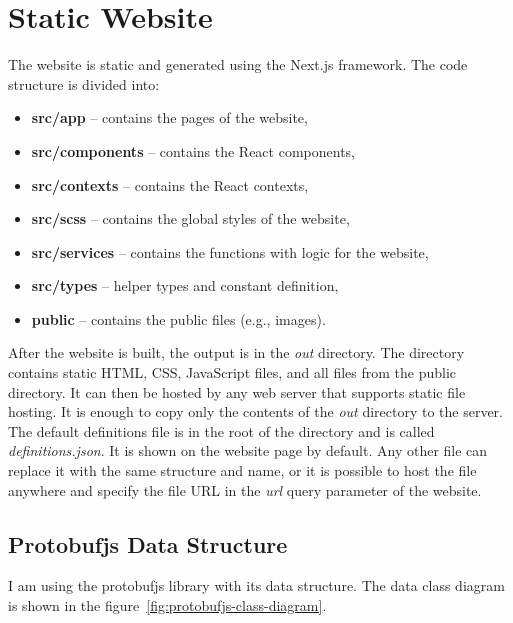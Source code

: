 \section{Static Website}
The website is static and generated using the Next.js framework.
The code structure is divided into:
\begin{itemize}
    \item \textbf{src/app} -- contains the pages of the website,
    \item \textbf{src/components} -- contains the React components,
    \item \textbf{src/contexts} -- contains the React contexts,
    \item \textbf{src/scss} -- contains the global styles of the website,
    \item \textbf{src/services} -- contains the functions with logic for the website,
    \item \textbf{src/types} -- helper types and constant definition,
    \item \textbf{public} -- contains the public files (e.g., images).
\end{itemize}

After the website is built, the output is in the \textit{out} directory.
The directory contains static HTML, CSS, JavaScript files, and all files from the public directory.
It can then be hosted by any web server that supports static file hosting.
It is enough to copy only the contents of the \textit{out} directory to the server.
The default definitions file is in the root of the directory and is called \textit{definitions.json}.
It is shown on the website page by default.
Any other file can replace it with the same structure and name, or it is possible to host the file anywhere and specify the file URL in the \textit{url} query parameter of the website.

\subsection{Protobufjs Data Structure}
I am using the protobufjs library with its data structure.
The data class diagram is shown in the figure~\ref{fig:protobufjs-class-diagram}.

